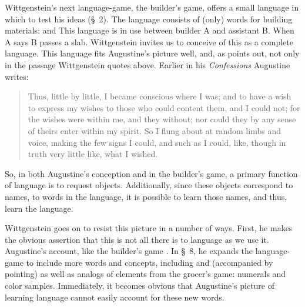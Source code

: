 \documentclass[doc,12pt,apacite,biblatex]{apa6}
\begin{document}
Wittgenstein's next language-game, the builder's game, offers a small language
in which to test 
%
%
his ideas (\S~2). The language consists of (only) words for
building materials:    and  This
language is in use between builder A and assistant B. When A says  B
passes a slab. Wittgenstein invites us to conceive of this as a complete
language. This language fits Augustine's picture well, and, as 
points out, not only in the passage Wittgenstein quotes above. Earlier in his
\emph{Confessions} Augustine writes: \begin{quote}
	Thus, little by little, I became conscious where I was; and to have a wish
	to express my wishes to those who could content them, and I could not; for
	the wishes were within me, and they without; nor could they by any sense of
	theirs enter within my spirit. So I flung about at random limbs and voice,
	making the few signs I could, and such as I could, like, though in truth
	very little like, what I wished. \cite[\S 1.6.8]{Pusey09}
\end{quote}
So, in both Augustine's conception and in the builder's game, a
primary function of language is to request objects. Additionally, since these
objects correspond to names, to words in the language, it is possible to learn
those names, and thus, learn the language.

Wittgenstein goes on to resist this picture in a number of ways. First, he
makes the obvious assertion that this is not all there is to language as we use
it. Augustine's account, like the builder's game 
\cite[\S~3]{Wittgenstein53}. In \S~8, he expands the language-game to include
more words and concepts, including  and  (accompanied by
pointing) as well as analogs of elements from the grocer's game: numerals and
color samples. Immediately, it becomes obvious that Augustine's picture of
learning language cannot easily account for these new words.
\end{document}
